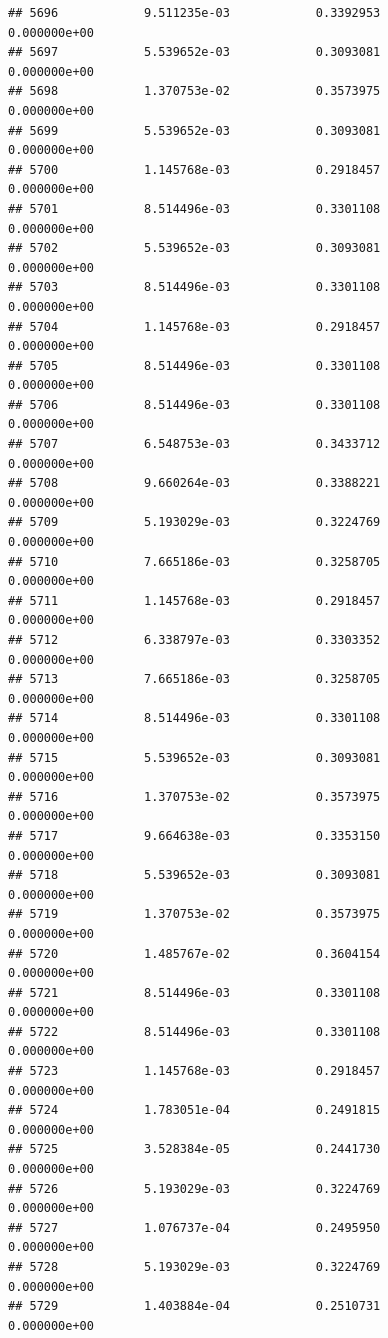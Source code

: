 \documentclass[
]{article}
\begin{document}
\begin{verbatim}
## 5696            9.511235e-03            0.3392953            0.000000e+00
## 5697            5.539652e-03            0.3093081            0.000000e+00
## 5698            1.370753e-02            0.3573975            0.000000e+00
## 5699            5.539652e-03            0.3093081            0.000000e+00
## 5700            1.145768e-03            0.2918457            0.000000e+00
## 5701            8.514496e-03            0.3301108            0.000000e+00
## 5702            5.539652e-03            0.3093081            0.000000e+00
## 5703            8.514496e-03            0.3301108            0.000000e+00
## 5704            1.145768e-03            0.2918457            0.000000e+00
## 5705            8.514496e-03            0.3301108            0.000000e+00
## 5706            8.514496e-03            0.3301108            0.000000e+00
## 5707            6.548753e-03            0.3433712            0.000000e+00
## 5708            9.660264e-03            0.3388221            0.000000e+00
## 5709            5.193029e-03            0.3224769            0.000000e+00
## 5710            7.665186e-03            0.3258705            0.000000e+00
## 5711            1.145768e-03            0.2918457            0.000000e+00
## 5712            6.338797e-03            0.3303352            0.000000e+00
## 5713            7.665186e-03            0.3258705            0.000000e+00
## 5714            8.514496e-03            0.3301108            0.000000e+00
## 5715            5.539652e-03            0.3093081            0.000000e+00
## 5716            1.370753e-02            0.3573975            0.000000e+00
## 5717            9.664638e-03            0.3353150            0.000000e+00
## 5718            5.539652e-03            0.3093081            0.000000e+00
## 5719            1.370753e-02            0.3573975            0.000000e+00
## 5720            1.485767e-02            0.3604154            0.000000e+00
## 5721            8.514496e-03            0.3301108            0.000000e+00
## 5722            8.514496e-03            0.3301108            0.000000e+00
## 5723            1.145768e-03            0.2918457            0.000000e+00
## 5724            1.783051e-04            0.2491815            0.000000e+00
## 5725            3.528384e-05            0.2441730            0.000000e+00
## 5726            5.193029e-03            0.3224769            0.000000e+00
## 5727            1.076737e-04            0.2495950            0.000000e+00
## 5728            5.193029e-03            0.3224769            0.000000e+00
## 5729            1.403884e-04            0.2510731            0.000000e+00

\end{verbatim}
\end{document}
